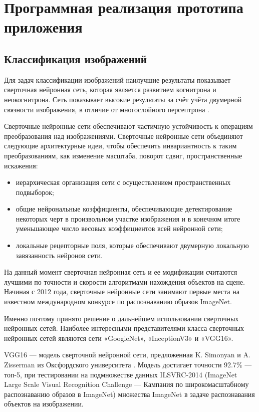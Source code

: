 \sectioncounter
\section{Программная реализация прототипа приложения}

\subsection{Классификация изображений}

Для задач классификации изображений наилучшие результаты показывает сверточная нейронная сеть, которая является развитием когнитрона и неокогнитрона. 
Сеть показывает высокие результаты за счёт учёта двумерной связности изображения, в отличие от многослойного персептрона \cite{conv-neoro}. 

Сверточные нейронные сети обеспечивают частичную устойчивость к операциям преобразования над изображениями. 
Сверточные нейронные сети объединяют следующие архитектурные идеи, чтобы обеспечить инвариантность к таким преобразованиям, как изменение масштаба, поворот сдвиг, пространственные искажения:
\begin{itemize}
    \item иерархическая организация сети с осуществлением пространственных подвыборок;
    \item общие нейрональные коэффициенты, обеспечивающие детектирование некоторых черт в произвольном участке изображения и в конечном итоге уменьшающее число весовых коэффициентов всей нейронной сети;
    \item локальные рецепторные поля, которые обеспечивают двумерную локальную завязанность нейронов сети.
\end{itemize}

На данный момент сверточная нейронная сеть и ее модификации считаются лучшими по точности и скорости алгоритмами нахождения объектов на сцене. 
Начиная с 2012 года, сверточные нейронные сети занимают первые места на известном международном конкурсе по распознаванию образов ImageNet.

Именно поэтому принято решение о дальнейшем использовании сверточных нейронных сетей. 
Наиболее интересными представителями класса сверточных нейронных сетей являются сети «GoogleNet», «InceptionV3» и «VGG16».

VGG16 — модель сверточной нейронной сети, предложенная K. Simonyan и A. Zisserman из Оксфордского университета \cite{vgg16alg}. 
Модель достигает точности 92.7\% — топ-5, при тестировании на подмножестве данных ILSVRC-2014 (ImageNet Large Scale Visual Recognition Challenge — Кампания по широкомасштабному распознаванию образов в ImageNet) множества ImageNet в задаче распознавания объектов на изображении. 

